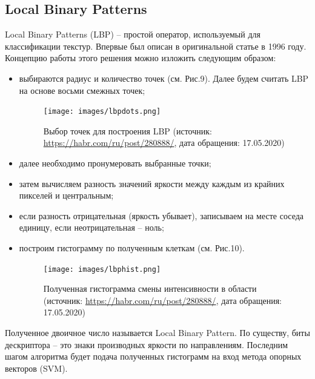 \documentclass[14pt]{matmex-diploma-custom}
\begin{document}
    \subsection{Local Binary Patterns}
            Local Binary Patterns (LBP) -- простой оператор, используемый для классификации текстур. Впервые был описан в оригинальной статье \cite{lbp} в 1996 году. Концепцию работы этого решения можно изложить следующим образом:
            \begin{itemize}
                \item выбираются радиус и количество точек (см. Рис.9). Далее будем считать LBP на основе восьми смежных точек;
                \begin{figure}[h]
                    \centering
                    \texttt{[image: images/lbpdots.png]}
                    \caption{Выбор точек для построения LBP (источник: \url{https://habr.com/ru/post/280888/}, дата обращения: 17.05.2020)}
                 \end{figure}  
                 
                \item далее необходимо пронумеровать выбранные точки;
                \item затем вычисляем разность значений яркости между каждым из крайних пикселей и центральным;
                \item если разность отрицательная (яркость убывает), записываем на месте соседа единицу, если неотрицательная -- ноль;
                \item построим гистограмму по полученным клеткам (см. Рис.10).
                    \begin{figure}[h]
                        \centering
                        \texttt{[image: images/lbphist.png]}
                        \caption{Полученная гистограмма смены интенсивности в области (источник: \url{https://habr.com/ru/post/280888/}, дата обращения: 17.05.2020)}
                    \end{figure}  
            \end{itemize}
            
            Полученное двоичное число называется Local Binary Pattern. По существу, биты дескриптора -- это знаки производных яркости по направлениям. Последним шагом алгоритма будет подача полученных гистограмм на вход метода опорных векторов (SVM). 
            
\end{document}
